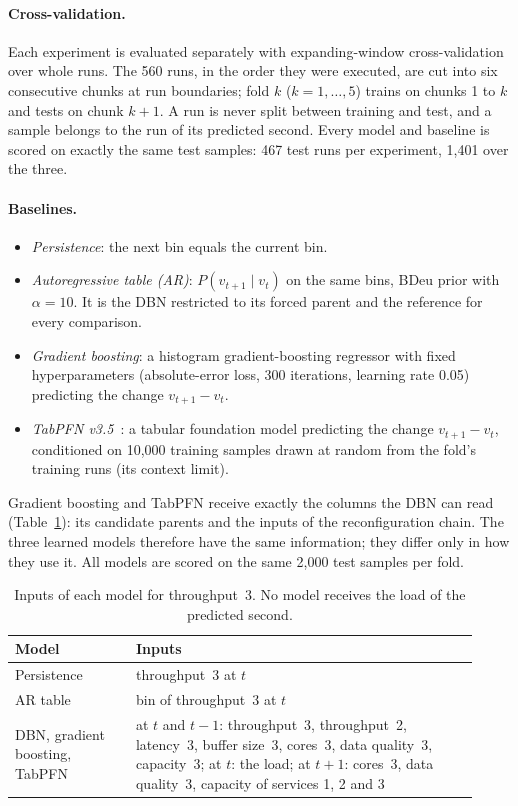 \paragraph{Cross-validation.}
Each experiment is evaluated separately with expanding-window cross-validation over whole runs.
The 560 runs, in the order they were executed, are cut into six consecutive chunks at run boundaries; fold $k$ ($k = 1, \dots, 5$) trains on chunks 1 to $k$ and tests on chunk $k+1$.
A run is never split between training and test, and a sample belongs to the run of its predicted second.
Every model and baseline is scored on exactly the same test samples: 467 test runs per experiment, 1{,}401 over the three.

\paragraph{Baselines.}
\begin{itemize}
  \item \emph{Persistence}: the next bin equals the current bin.
  \item \emph{Autoregressive table (AR)}: $P(v_{t+1} \mid v_t)$ on the same bins, BDeu prior with $\alpha = 10$. It is the DBN restricted to its forced parent and the reference for every comparison.
  \item \emph{Gradient boosting}: a histogram gradient-boosting regressor with fixed hyperparameters (absolute-error loss, 300 iterations, learning rate 0.05) predicting the change $v_{t+1} - v_t$.
  \item \emph{TabPFN v3.5}~\cite{tabpfn}: a tabular foundation model predicting the change $v_{t+1} - v_t$, conditioned on 10{,}000 training samples drawn at random from the fold's training runs (its context limit).
\end{itemize}
Gradient boosting and TabPFN receive exactly the columns the DBN can read (Table~\ref{tab:inputs}): its candidate parents and the inputs of the reconfiguration chain.
The three learned models therefore have the same information; they differ only in how they use it.
All models are scored on the same 2{,}000 test samples per fold.

\begin{table}[t]
  \centering
  \caption{Inputs of each model for throughput~3. No model receives the load of the predicted second.}
  \label{tab:inputs}
  \begin{tabular}{p{0.24\linewidth}p{0.68\linewidth}}
    \toprule
    Model & Inputs \\
    \midrule
    Persistence & throughput~3 at $t$ \\
    AR table & bin of throughput~3 at $t$ \\
    DBN, gradient boosting, TabPFN &
      at $t$ and $t-1$: throughput~3, throughput~2, latency~3, buffer size~3, cores~3, data quality~3, capacity~3;
      at $t$: the load;
      at $t+1$: cores~3, data quality~3, capacity of services 1, 2 and 3 \\
    \bottomrule
  \end{tabular}
\end{table}

